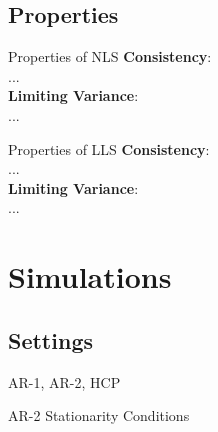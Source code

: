 \documentclass[12pt]{beamer}
\begin{document}
\subsection{Properties}
\begin{frame}{Properties of NLS}
\scriptsize 
\textbf{Consistency}:\\
...\\
\textbf{Limiting Variance}:\\
...\\
\end{frame}


\begin{frame}{Properties of LLS}
\scriptsize 
\textbf{Consistency}:\\
...\\
\textbf{Limiting Variance}:\\
...\\
\end{frame}

\section{Simulations}

\subsection{Settings}
\begin{frame}{AR-1, AR-2, HCP}
\end{frame}

\begin{frame}{AR-2 Stationarity Conditions}
\centering
{}
\end{frame}
\end{document}
